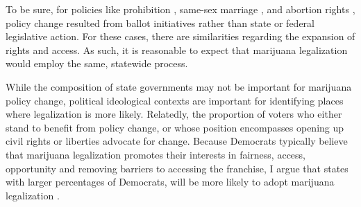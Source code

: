 To be sure, for policies like prohibition \citep{andrews_and_seguin_2015,gusfield_1963}, same-sex marriage \citep{soule_2004}, and abortion rights \citep{mcveigh_and_diaz_2009}, policy change resulted from ballot initiatives rather than state or federal legislative action. For these cases, there are similarities regarding the expansion of rights and access. As such, it is reasonable to expect that marijuana legalization would employ the same, statewide process.








While the composition of state governments may not be important for marijuana policy change, political ideological contexts are important for identifying places where legalization is more likely. Relatedly, the proportion of voters who either stand to benefit from policy change, or whose position encompasses opening up civil rights or liberties advocate for change. Because Democrats typically believe that marijuana legalization promotes their interests in fairness, access, opportunity and removing barriers to accessing the franchise, I argue that states with larger percentages of Democrats, will be more likely to adopt marijuana legalization \citep{mccammon_et_al_2007,mccammon_et_al_2001,soule_and_olzak_2004}.


